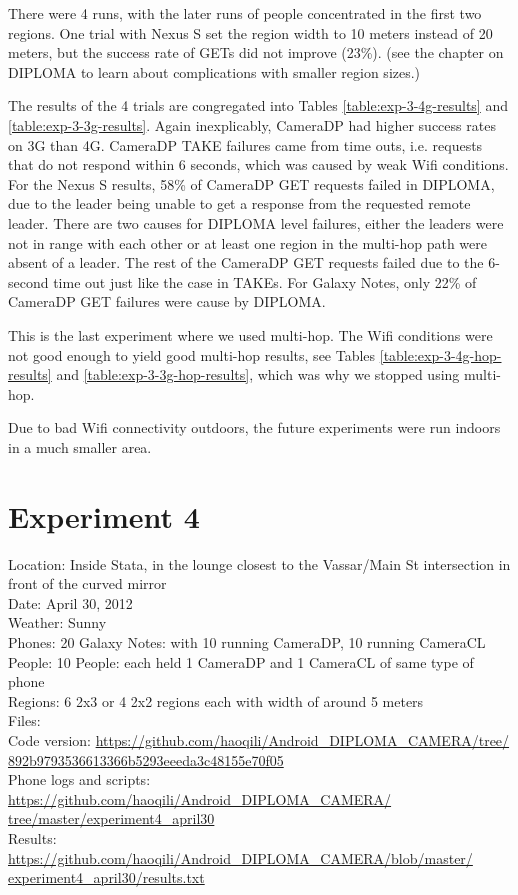 There were 4 runs, with the later runs of people concentrated in the first two regions. One trial with Nexus S set the region width to 10 meters instead of 20 meters, but the success rate of GETs did not improve (23\%). (see the chapter on DIPLOMA to learn about complications with smaller region sizes.)

The results of the 4 trials are congregated into Tables \ref{table:exp-3-4g-results} and \ref{table:exp-3-3g-results}. Again inexplicably, CameraDP had higher success rates on 3G than 4G.  CameraDP TAKE failures came from time outs, i.e. requests that do not respond within 6 seconds, which was caused by weak Wifi conditions. For the Nexus S results, 58\% of CameraDP GET requests failed in DIPLOMA, due to the leader being unable to get a response from the requested remote leader. There are two causes for DIPLOMA level failures, either the leaders were not in range with each other or at least one region in the multi-hop path were absent of a leader. The rest of the CameraDP GET requests failed due to the 6-second time out just like the case in TAKEs. For Galaxy Notes, only 22\% of CameraDP GET failures were cause by DIPLOMA.

This is the last experiment where we used multi-hop. The Wifi conditions were not good enough to yield good multi-hop results, see Tables \ref{table:exp-3-4g-hop-results} and \ref{table:exp-3-3g-hop-results}, which was why we stopped using multi-hop.

Due to bad Wifi connectivity outdoors, the future experiments were run indoors in a much smaller area.

\section{Experiment 4}

Location: Inside Stata, in the lounge closest to the Vassar/Main St intersection in front of the curved mirror\\
Date: April 30, 2012\\
Weather: Sunny\\
Phones: 20 Galaxy Notes: with 10 running CameraDP, 10 running CameraCL\\
People: 10 People: each held 1 CameraDP and 1 CameraCL of same type of phone\\
Regions: 6 2x3 or 4 2x2 regions each with width of around 5 meters\\
Files:\\
Code version: {\url{https://github.com/haoqili/Android_DIPLOMA_CAMERA/tree/}}\\
{\url{892b9793536613366b5293eeeda3c48155e70f05}}\\
Phone logs and scripts: {\url{https://github.com/haoqili/Android_DIPLOMA_CAMERA/}}\\
{\url{tree/master/experiment4_april30}}\\ 
Results: {\url{https://github.com/haoqili/Android_DIPLOMA_CAMERA/blob/master/}}\\
{\url{experiment4_april30/results.txt}}\\

